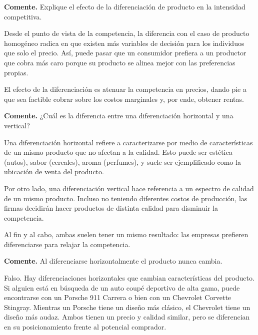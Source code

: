 \question \textbf{Comente.} Explique el efecto de la diferenciación de producto en la intensidad competitiva.
\begin{solution}
Desde el punto de vista de la competencia, la diferencia con el caso de producto homogéneo radica en que existen más variables de decisión para los individuos que solo el precio. Así, puede pasar que un consumidor prefiera a un productor que cobra más caro porque su producto se alinea mejor con las preferencias propias.

El efecto de la diferenciación es atenuar la competencia en precios, dando pie a que sea factible cobrar sobre los costos marginales y, por ende, obtener rentas.

\end{solution}

\question \textbf{Comente.} ¿Cuál es la diferencia entre una diferenciación horizontal y una vertical?
\begin{solution}
Una diferenciación horizontal refiere a caracterizarse por medio de características de un mismo producto que no afectan a la calidad. Esto puede ser estética (autos), sabor (cereales), aroma (perfumes), y suele ser ejemplificado como la ubicación de venta del producto.

Por otro lado, una diferenciación vertical hace referencia a un espectro de calidad de un mismo producto. Incluso no teniendo diferentes costos de producción, las firmas decidirán hacer productos de distinta calidad para disminuir la competencia.

Al fin y al cabo, ambas suelen tener un mismo resultado: las empresas prefieren diferenciarse para relajar la competencia.

\end{solution}

\question \textbf{Comente.} Al diferenciarse horizontalmente el producto nunca cambia.
\begin{solution}
Falso. Hay diferenciaciones horizontales que cambian características del producto. Si alguien está en búsqueda de un auto coupé deportivo de alta gama, puede encontrarse con un Porsche 911 Carrera o bien con un Chevrolet Corvette Stingray. Mientras un Porsche tiene un diseño más clásico, el Chevrolet tiene un diseño más audaz. Ambos tienen un precio y calidad similar, pero se diferencian en su posicionamiento frente al potencial comprador.

\end{solution}

